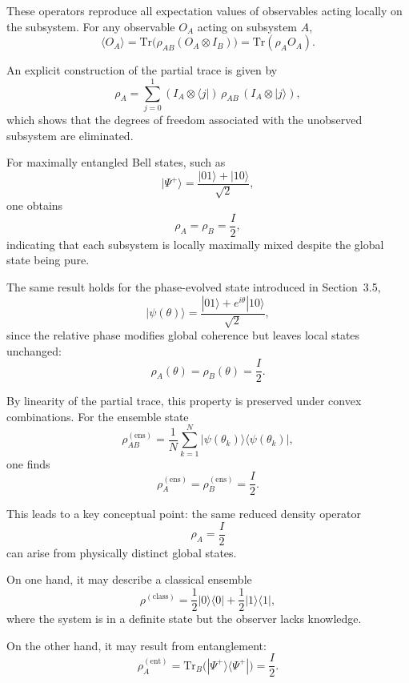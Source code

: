 \documentclass[a4paper]{article}
\begin{document}
\medskip

These operators reproduce all expectation values of observables acting locally on the subsystem. For any observable \( O_A \) acting on subsystem \( A \),
\[
\langle O_A \rangle
=
\mathrm{Tr}\!\big(\rho_{AB}(O_A \otimes I_B)\big)
=
\mathrm{Tr}(\rho_A O_A).
\]

\medskip

An explicit construction of the partial trace is given by
\[
\rho_A
=
\sum_{j=0}^{1}
(I_A \otimes \langle j|)\,\rho_{AB}\,(I_A \otimes |j\rangle),
\]
which shows that the degrees of freedom associated with the unobserved subsystem are eliminated.

\medskip

For maximally entangled Bell states, such as
\[
|\Psi^+\rangle = \frac{|01\rangle + |10\rangle}{\sqrt{2}},
\]
one obtains
\[
\rho_A = \rho_B = \frac{I}{2},
\]
indicating that each subsystem is locally maximally mixed despite the global state being pure.

\medskip

The same result holds for the phase-evolved state introduced in Section~3.5,
\[
|\psi(\theta)\rangle = \frac{|01\rangle + e^{i\theta}|10\rangle}{\sqrt{2}},
\]
since the relative phase modifies global coherence but leaves local states unchanged:
\[
\rho_A(\theta) = \rho_B(\theta) = \frac{I}{2}.
\]

\medskip

By linearity of the partial trace, this property is preserved under convex combinations. For the ensemble state
\[
\rho_{AB}^{(\mathrm{ens})}
=
\frac{1}{N}
\sum_{k=1}^{N}
|\psi(\theta_k)\rangle\langle\psi(\theta_k)|,
\]
one finds
\[
\rho_A^{(\mathrm{ens})} = \rho_B^{(\mathrm{ens})} = \frac{I}{2}.
\]

\medskip

This leads to a key conceptual point: the same reduced density operator
\[
\rho_A = \frac{I}{2}
\]
can arise from physically distinct global states.

\medskip

On one hand, it may describe a classical ensemble
\[
\rho^{(\mathrm{class})}
=
\frac{1}{2}|0\rangle\langle 0|
+
\frac{1}{2}|1\rangle\langle 1|,
\]
where the system is in a definite state but the observer lacks knowledge.

On the other hand, it may result from entanglement:
\[
\rho_A^{(\mathrm{ent})}
=
\mathrm{Tr}_B\big(|\Psi^+\rangle\langle\Psi^+|\big)
=
\frac{I}{2}.
\]

\medskip
\end{document}
